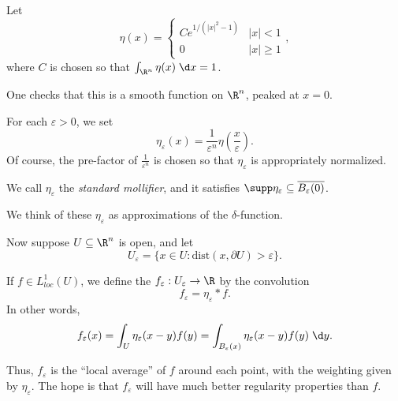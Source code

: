 \documentclass[a4paper]{article}
\begin{document}
\begin{defi}
  Let
  \[
    \eta(x) =
    \begin{cases}
      C e^{1/(|x|^2 - 1)}& |x| < 1\\
      0 & |x| \geq 1
    \end{cases} ,
  \]
  where $C$ is chosen so that $\int_{\R^n} \eta(x) \;\d x = 1$.
  \begin{center}
  \end{center}
  One checks that this is a smooth function on $\R^n$, peaked at $x = 0$.

  For each $\varepsilon > 0$, we set
  \[
    \eta_\varepsilon(x) = \frac{1}{\varepsilon^n} \eta\left(\frac{x}{\varepsilon}\right).
  \]
  Of course, the pre-factor of $\frac{1}{\varepsilon^n}$ is chosen so that $\eta_\varepsilon$ is appropriately normalized.

  We call $\eta_\varepsilon$ the \emph{standard mollifier}, and it satisfies $\supp \eta_\varepsilon \subseteq \overline{B_\varepsilon(0)}$.
\end{defi}
We think of these $\eta_\varepsilon$ as approximations of the $\delta$-function.

Now suppose $U \subseteq \R^n$ is open, and let
\[
  U_\varepsilon = \{x \in U: \mathrm{dist}(x, \partial U) > \varepsilon\}.
\]
\begin{defi}[Mollification]
  If $f \in L^1_{loc}(U)$, we define the  $f_\varepsilon: U_\varepsilon \to \R$ by the convolution
  \[
    f_\varepsilon = \eta_\varepsilon * f.
  \]
  In other words,
  \[
    f_\varepsilon(x) = \int_U \eta_\varepsilon (x - y) f(y) = \int_{B_\varepsilon(x)} \eta_\varepsilon(x - y) f(y)\;\d y.
  \]
\end{defi}
Thus, $f_\varepsilon$ is the ``local average'' of $f$ around each point, with the weighting given by $\eta_\varepsilon$. The hope is that $f_\varepsilon$ will have much better regularity properties than $f$.
\end{document}
